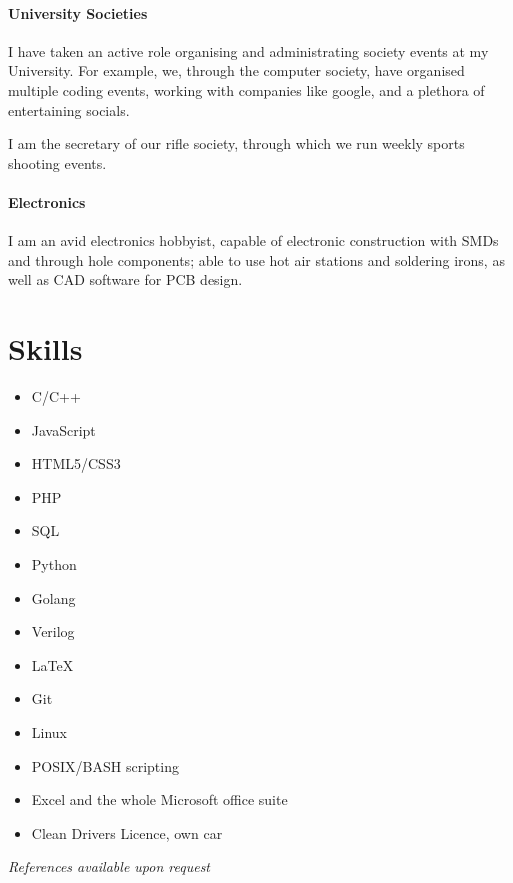 \documentclass[9pt,a4paper]{article}
\begin{document}
\begin{multicols*}{2}
\paragraph{University Societies}
I have taken an active role organising and administrating society events at my University.
For example, we, through the computer society, have organised multiple coding events, working with companies like google, and a plethora of entertaining socials.

I am the secretary of our rifle society, through which we run weekly sports shooting events.

\paragraph{Electronics}
I am an avid electronics hobbyist, capable of electronic construction with SMDs and through hole components;
able to use hot air stations and soldering irons, as well as CAD software for PCB design.

\iftrue
\section*{Skills}
\begin{multicols*}{2}
\begin{itemize}
\item C/C++
\item JavaScript
\item HTML5/CSS3
\item PHP
\item SQL
\item Python
\item Golang
\item Verilog
\item \LaTeX 
\item Git
\item Linux
\item POSIX/BASH scripting
\item Excel and the whole Microsoft office suite
\item Clean Drivers Licence, own car
\end{itemize}
\end{multicols*}
\fi
\vfill
\textit{References available upon request}
\end{multicols*}
\end{document}
